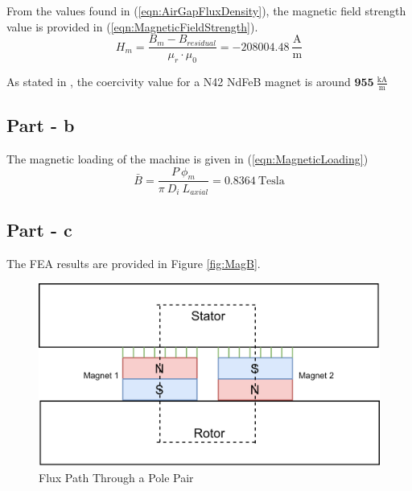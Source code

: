 \documentclass{article}
\begin{document}
\noindent From the values found in (\ref{eqn:AirGapFluxDensity}), the magnetic field strength value is provided in (\ref{eqn:MagneticFieldStrength}).
\begin{equation} \label{eqn:MagneticFieldStrength}
    H_m = \frac{B_m-B_{residual}}{\mu_r \cdot \mu_0} = -208004.48 \: \mathrm{\frac{A}{m}}
\end{equation}

As stated in \cite{e-magnetsuk}, the coercivity value for a N42 NdFeB magnet is around $\pmb{955} \: \pmb{\mathrm{\frac{kA}{m}}}$

\subsection{Part - b}
The magnetic loading of the machine is given in (\ref{eqn:MagneticLoading})
\begin{equation} \label{eqn:MagneticLoading}
    \bar{B} = \frac{P\:\phi_{m}}{\pi \: D_i \: L_{axial}} = 0.8364 \: \mathrm{Tesla}
\end{equation}

\subsection{Part - c}
The FEA results are provided in Figure \ref{fig:MagB}.
\begin{figure}[h!]
\centering
\includegraphics[scale=1.2]{Figures/FluxPath.png}
\caption{Flux Path Through a Pole Pair }
\label{fig:FluxPath}
\end{figure}
\end{document}
